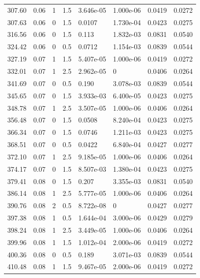 \documentclass[preview]{standalone}
\begin{document}
{{{\begin{tabular}{L{1.2cm}C{1.2cm} C{0.3cm}C{0.5cm} C{1.4cm}C{1.4cm} C{1.4cm}C{1.4cm}}
  307.60  &  0.06  & 1     & 1.5 &  3.646e-05  & 1.000e-06  & 0.0419 &  0.0272   \\ 
  307.63  &  0.06  & 0     & 1.5 &  0.0107  & 1.730e-04  & 0.0423 &  0.0275   \\ 
  316.56  &  0.06  & 0     & 1.5 &  0.113  & 1.832e-03  & 0.0831 &  0.0540   \\ 
  324.42  &  0.06  & 0     & 0.5 &  0.0712  & 1.154e-03  & 0.0839 &  0.0544   \\ 
  327.19  &  0.07  & 1     & 1.5 &  5.407e-05  & 1.000e-06  & 0.0419 &  0.0272   \\ 
  332.01  &  0.07  & 1     & 2.5 &  2.962e-05  & 0  & 0.0406 &  0.0264   \\ 
  341.69  &  0.07  & 0     & 0.5 &  0.190  & 3.078e-03  & 0.0839 &  0.0544   \\ 
  345.65  &  0.07  & 0     & 1.5 &  3.933e-03  & 6.400e-05  & 0.0423 &  0.0275   \\ 
  348.78  &  0.07  & 1     & 2.5 &  3.507e-05  & 1.000e-06  & 0.0406 &  0.0264   \\ 
  356.48  &  0.07  & 0     & 1.5 &  0.0508  & 8.240e-04  & 0.0423 &  0.0275   \\ 
  366.34  &  0.07  & 0     & 1.5 &  0.0746  & 1.211e-03  & 0.0423 &  0.0275   \\ 
  368.51  &  0.07  & 0     & 0.5 &  0.0422  & 6.840e-04  & 0.0427 &  0.0277   \\ 
  372.10  &  0.07  & 1     & 2.5 &  9.185e-05  & 1.000e-06  & 0.0406 &  0.0264   \\ 
  374.17  &  0.07  & 0     & 1.5 &  8.507e-03  & 1.380e-04  & 0.0423 &  0.0275   \\ 
  379.41  &  0.08  & 0     & 1.5 &  0.207  & 3.355e-03  & 0.0831 &  0.0540   \\ 
  386.14  &  0.08  & 1     & 2.5 &  5.777e-05  & 1.000e-06  & 0.0406 &  0.0264   \\ 
  390.76  &  0.08  & 2     & 0.5 &  8.722e-08  & 0  & 0.0427 &  0.0277   \\ 
  397.38  &  0.08  & 1     & 0.5 &  1.644e-04  & 3.000e-06  & 0.0429 &  0.0279   \\ 
  398.24  &  0.08  & 1     & 2.5 &  3.449e-05  & 1.000e-06  & 0.0406 &  0.0264   \\ 
  399.96  &  0.08  & 1     & 1.5 &  1.012e-04  & 2.000e-06  & 0.0419 &  0.0272   \\ 
  400.36  &  0.08  & 0     & 0.5 &  0.189  & 3.071e-03  & 0.0839 &  0.0544   \\ 
  410.48  &  0.08  & 1     & 1.5 &  9.467e-05  & 2.000e-06  & 0.0419 &  0.0272   \\ 

\end{tabular}}}}
\end{document}
